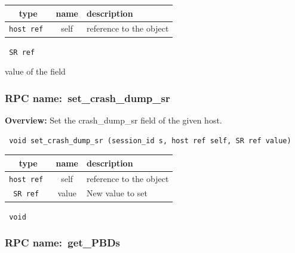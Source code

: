 
 
\vspace{0.3cm}
\begin{tabular}{|c|c|p{7cm}|}
 \hline
{\bf type} & {\bf name} & {\bf description} \\ \hline
{\tt host ref } & self & reference to the object \\ \hline 

\end{tabular}

\vspace{0.3cm}

{\tt 
SR ref
}


value of the field
\vspace{0.3cm}
\vspace{0.3cm}
\vspace{0.3cm}
\subsubsection{RPC name:~set\_crash\_dump\_sr}

{\bf Overview:} 
Set the crash\_dump\_sr field of the given host.

\begin{verbatim} void set_crash_dump_sr (session_id s, host ref self, SR ref value)\end{verbatim}



 
\vspace{0.3cm}
\begin{tabular}{|c|c|p{7cm}|}
 \hline
{\bf type} & {\bf name} & {\bf description} \\ \hline
{\tt host ref } & self & reference to the object \\ \hline 

{\tt SR ref } & value & New value to set \\ \hline 

\end{tabular}

\vspace{0.3cm}

{\tt 
void
}



\vspace{0.3cm}
\vspace{0.3cm}
\vspace{0.3cm}
\subsubsection{RPC name:~get\_PBDs}

